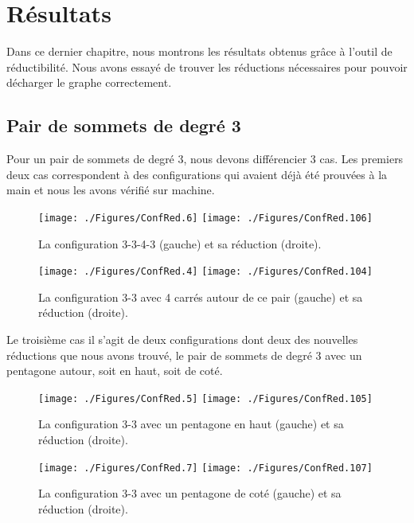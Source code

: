 \documentclass[10pt,a4paper]{article}
\begin{document}
\section{Résultats}
\label{chap:res}

Dans ce dernier chapitre, nous montrons les résultats obtenus grâce à l'outil de réductibilité. Nous avons essayé de trouver les réductions nécessaires pour pouvoir décharger le graphe correctement.

\subsection{Pair de sommets de degré 3}
Pour un pair de sommets de degré 3, nous devons différencier 3 cas. Les premiers deux cas correspondent à des configurations qui avaient déjà été prouvées à la main et nous les avons vérifié sur machine.

\begin{figure}[ht]
\centerline{
\texttt{[image: ./Figures/ConfRed.6]}
\hfil
\texttt{[image: ./Figures/ConfRed.106]}
}
\caption{La configuration 3-3-4-3 (gauche) et sa réduction (droite).}
\label{fig:3343}
\end{figure}

\begin{figure}[ht]
\centerline{
\texttt{[image: ./Figures/ConfRed.4]}
\hfil
\texttt{[image: ./Figures/ConfRed.104]}
}
\caption{La configuration 3-3 avec 4 carrés autour de ce pair (gauche) et sa réduction (droite).}
\label{fig:33C}
\end{figure}

Le troisième cas il s'agit de deux configurations dont deux des nouvelles réductions que nous avons trouvé, le pair de sommets de degré 3 avec un pentagone autour, soit en haut, soit de coté.

\begin{figure}[ht]
\centerline{
\texttt{[image: ./Figures/ConfRed.5]}
\hfil
\texttt{[image: ./Figures/ConfRed.105]}
}
\caption{La configuration 3-3 avec un pentagone en haut (gauche) et sa réduction (droite).}
\label{fig:33PH}
\end{figure}

\begin{figure}[ht]
\centerline{
\texttt{[image: ./Figures/ConfRed.7]}
\hfil
\texttt{[image: ./Figures/ConfRed.107]}
}
\caption{La configuration 3-3 avec un pentagone de coté (gauche) et sa réduction (droite).}
\label{fig:33PC}
\end{figure}
\end{document}
